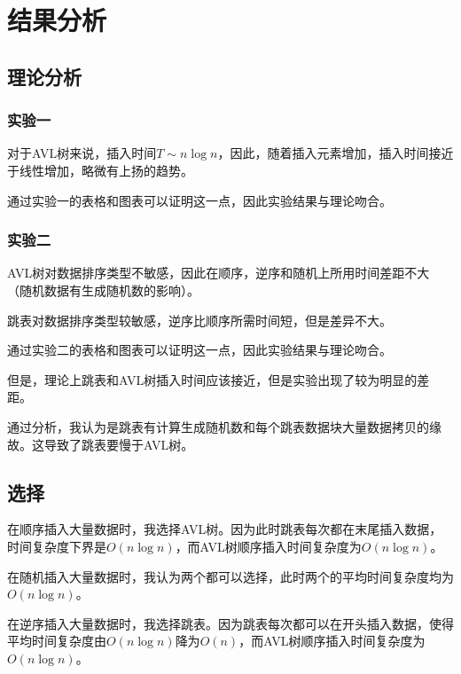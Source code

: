 \documentclass[UTF8]{ctexart}
\begin{document}
\section{结果分析}
\subsection{理论分析}
\subsubsection{实验一}
对于AVL树来说，插入时间$T \sim n\log n $，因此，随着插入元素增加，插入时间接近于线性增加，略微有上扬的趋势。

通过实验一的表格和图表可以证明这一点，因此实验结果与理论吻合。
\subsubsection{实验二}
AVL树对数据排序类型不敏感，因此在顺序，逆序和随机上所用时间差距不大（随机数据有生成随机数的影响）。

跳表对数据排序类型较敏感，逆序比顺序所需时间短，但是差异不大。

通过实验二的表格和图表可以证明这一点，因此实验结果与理论吻合。

但是，理论上跳表和AVL树插入时间应该接近，但是实验出现了较为明显的差距。

通过分析，我认为是跳表有计算生成随机数和每个跳表数据块大量数据拷贝的缘故。这导致了跳表要慢于AVL树。
\subsection{选择}
在顺序插入大量数据时，我选择AVL树。因为此时跳表每次都在末尾插入数据，时间复杂度下界是$O(n\log n)$，而AVL树顺序插入时间复杂度为$O(n\log n)$。

在随机插入大量数据时，我认为两个都可以选择，此时两个的平均时间复杂度均为$O(n\log n)$。

在逆序插入大量数据时，我选择跳表。因为跳表每次都可以在开头插入数据，使得平均时间复杂度由$O(n\log n)$降为$O(n)$，而AVL树顺序插入时间复杂度为$O(n\log n)$。
\end{document}
